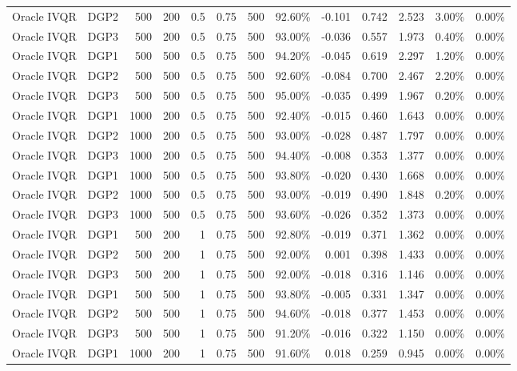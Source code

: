 \begin{landscape}
\begin{longtable}{llrrrrrrrrrrr}
Oracle IVQR & DGP2 & 500 & 200 & 0.5 & 0.75 & 500 & 92.60\% & -0.101 & 0.742 & 2.523 & 3.00\% & 0.00\% \\
Oracle IVQR & DGP3 & 500 & 200 & 0.5 & 0.75 & 500 & 93.00\% & -0.036 & 0.557 & 1.973 & 0.40\% & 0.00\% \\
Oracle IVQR & DGP1 & 500 & 500 & 0.5 & 0.75 & 500 & 94.20\% & -0.045 & 0.619 & 2.297 & 1.20\% & 0.00\% \\
Oracle IVQR & DGP2 & 500 & 500 & 0.5 & 0.75 & 500 & 92.60\% & -0.084 & 0.700 & 2.467 & 2.20\% & 0.00\% \\
Oracle IVQR & DGP3 & 500 & 500 & 0.5 & 0.75 & 500 & 95.00\% & -0.035 & 0.499 & 1.967 & 0.20\% & 0.00\% \\
Oracle IVQR & DGP1 & 1000 & 200 & 0.5 & 0.75 & 500 & 92.40\% & -0.015 & 0.460 & 1.643 & 0.00\% & 0.00\% \\
Oracle IVQR & DGP2 & 1000 & 200 & 0.5 & 0.75 & 500 & 93.00\% & -0.028 & 0.487 & 1.797 & 0.00\% & 0.00\% \\
Oracle IVQR & DGP3 & 1000 & 200 & 0.5 & 0.75 & 500 & 94.40\% & -0.008 & 0.353 & 1.377 & 0.00\% & 0.00\% \\
Oracle IVQR & DGP1 & 1000 & 500 & 0.5 & 0.75 & 500 & 93.80\% & -0.020 & 0.430 & 1.668 & 0.00\% & 0.00\% \\
Oracle IVQR & DGP2 & 1000 & 500 & 0.5 & 0.75 & 500 & 93.00\% & -0.019 & 0.490 & 1.848 & 0.20\% & 0.00\% \\
Oracle IVQR & DGP3 & 1000 & 500 & 0.5 & 0.75 & 500 & 93.60\% & -0.026 & 0.352 & 1.373 & 0.00\% & 0.00\% \\
Oracle IVQR & DGP1 & 500 & 200 & 1 & 0.75 & 500 & 92.80\% & -0.019 & 0.371 & 1.362 & 0.00\% & 0.00\% \\
Oracle IVQR & DGP2 & 500 & 200 & 1 & 0.75 & 500 & 92.00\% & 0.001 & 0.398 & 1.433 & 0.00\% & 0.00\% \\
Oracle IVQR & DGP3 & 500 & 200 & 1 & 0.75 & 500 & 92.00\% & -0.018 & 0.316 & 1.146 & 0.00\% & 0.00\% \\
Oracle IVQR & DGP1 & 500 & 500 & 1 & 0.75 & 500 & 93.80\% & -0.005 & 0.331 & 1.347 & 0.00\% & 0.00\% \\
Oracle IVQR & DGP2 & 500 & 500 & 1 & 0.75 & 500 & 94.60\% & -0.018 & 0.377 & 1.453 & 0.00\% & 0.00\% \\
Oracle IVQR & DGP3 & 500 & 500 & 1 & 0.75 & 500 & 91.20\% & -0.016 & 0.322 & 1.150 & 0.00\% & 0.00\% \\
Oracle IVQR & DGP1 & 1000 & 200 & 1 & 0.75 & 500 & 91.60\% & 0.018 & 0.259 & 0.945 & 0.00\% & 0.00\% \\

\end{longtable}
\end{landscape}
